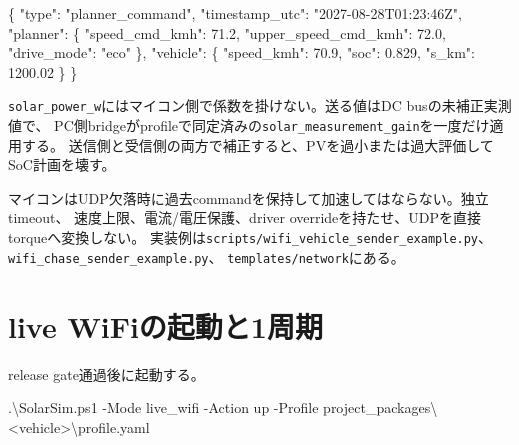 \documentclass[
  japanese,
  a4paper,
]{article}
\newenvironment{Shaded}{}{}
\newcommand{\DataTypeTok}[1]{\textcolor[rgb]{0.56,0.13,0.00}{#1}}
\newcommand{\FloatTok}[1]{\textcolor[rgb]{0.25,0.63,0.44}{#1}}
\newcommand{\FunctionTok}[1]{\textcolor[rgb]{0.02,0.16,0.49}{#1}}
\newcommand{\NormalTok}[1]{#1}
\newcommand{\OperatorTok}[1]{\textcolor[rgb]{0.40,0.40,0.40}{#1}}
\newcommand{\StringTok}[1]{\textcolor[rgb]{0.25,0.44,0.63}{#1}}
\begin{document}
\begin{Shaded}
\begin{Highlighting}[]
\FunctionTok{\{}
  \DataTypeTok{"type"}\FunctionTok{:} \StringTok{"planner\_command"}\FunctionTok{,}
  \DataTypeTok{"timestamp\_utc"}\FunctionTok{:} \StringTok{"2027{-}08{-}28T01:23:46Z"}\FunctionTok{,}
  \DataTypeTok{"planner"}\FunctionTok{:} \FunctionTok{\{}
    \DataTypeTok{"speed\_cmd\_kmh"}\FunctionTok{:} \FloatTok{71.2}\FunctionTok{,}
    \DataTypeTok{"upper\_speed\_cmd\_kmh"}\FunctionTok{:} \FloatTok{72.0}\FunctionTok{,}
    \DataTypeTok{"drive\_mode"}\FunctionTok{:} \StringTok{"eco"}
  \FunctionTok{\},}
  \DataTypeTok{"vehicle"}\FunctionTok{:} \FunctionTok{\{}
    \DataTypeTok{"speed\_kmh"}\FunctionTok{:} \FloatTok{70.9}\FunctionTok{,}
    \DataTypeTok{"soc"}\FunctionTok{:} \FloatTok{0.829}\FunctionTok{,}
    \DataTypeTok{"s\_km"}\FunctionTok{:} \FloatTok{1200.02}
  \FunctionTok{\}}
\FunctionTok{\}}
\end{Highlighting}
\end{Shaded}

\texttt{solar\_power\_w}にはマイコン側で係数を掛けない。送る値はDC
busの未補正実測値で、
PC側bridgeがprofileで同定済みの\texttt{solar\_measurement\_gain}を一度だけ適用する。
送信側と受信側の両方で補正すると、PVを過小または過大評価してSoC計画を壊す。

マイコンはUDP欠落時に過去commandを保持して加速してはならない。独立timeout、
速度上限、電流/電圧保護、driver
overrideを持たせ、UDPを直接torqueへ変換しない。
実装例は\texttt{scripts/wifi\_vehicle\_sender\_example.py}、\texttt{wifi\_chase\_sender\_example.py}、
\texttt{templates/network}にある。

\section{live
WiFiの起動と1周期}\label{live-wifiux306eux8d77ux52d5ux30681ux5468ux671f}

release gate通過後に起動する。

\begin{Shaded}
\begin{Highlighting}[]
\OperatorTok{.}\NormalTok{\textbackslash{}SolarSim}\OperatorTok{.}\FunctionTok{ps1} \OperatorTok{{-}}\NormalTok{Mode live\_wifi }\OperatorTok{{-}}\NormalTok{Action up }\OperatorTok{{-}}\NormalTok{Profile project\_packages\textbackslash{}}\OperatorTok{\textless{}}\NormalTok{vehicle}\OperatorTok{\textgreater{}}\NormalTok{\textbackslash{}profile}\OperatorTok{.}\FunctionTok{yaml}
\end{Highlighting}
\end{Shaded}
\end{document}
